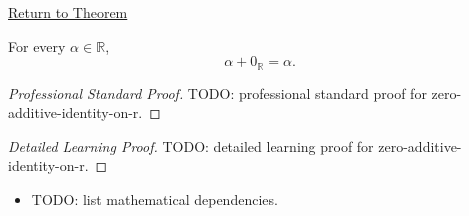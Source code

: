 \newpage
{}
\label{prf:zero-additive-identity-on-r}

\begin{remark*}[Return]
\hyperref[thm:zero-additive-identity-on-r]{Return to Theorem}
\end{remark*}

\begin{theorem*}
For every $\alpha\in\mathbb{R}$,
\[
\alpha+0_{\mathbb{R}}=\alpha.
\]
\end{theorem*}

\begin{proof}[Professional Standard Proof]
\LRAProofBodyStart
TODO: professional standard proof for zero-additive-identity-on-r.
\end{proof}

\begin{proof}[Detailed Learning Proof]
\LRAProofBodyStart
TODO: detailed learning proof for zero-additive-identity-on-r.
\end{proof}

\begin{remark*}
\end{remark*}

\begin{dependencies}
\begin{itemize}
  \item TODO: list mathematical dependencies.
\end{itemize}
\end{dependencies}

\clearpage
